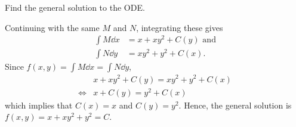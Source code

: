 Find the general solution to the ODE.

\nnl Continuing with the same $M$ and $N$, integrating these gives
\begin{align*}
    \int M \dd x &= x + xy^2 + C(y) \text{ and}\\
    \int N \dd y &= xy^2 + y^2 + C(x).
\end{align*}
Since $f(x,y) = \int M \dd x = \int N \dd y$, 
\begin{align*}
    & x + xy^2 + C(y) = xy^2 + y^2 + C(x)\\
    \iff & x + C(y) = y^2 + C(x)
\end{align*}
which implies that $C(x) = x$ and $C(y) = y^2$. Hence, the general solution is $f(x,y) = x + xy^2 + y^2 = C$.